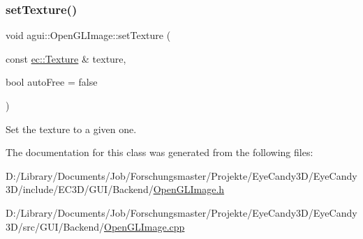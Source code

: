 \subsubsection{\texorpdfstring{set\+Texture()}{setTexture()}}
{\footnotesize\ttfamily void agui\+::\+Open\+G\+L\+Image\+::set\+Texture (\begin{DoxyParamCaption}\item[{const \mbox{\hyperlink{classec_1_1_texture}{ec\+::\+Texture}} \&}]{texture,  }\item[{bool}]{auto\+Free = {\ttfamily false} }\end{DoxyParamCaption})}

Set the texture to a given one. 

The documentation for this class was generated from the following files\+:\begin{DoxyCompactItemize}
\item 
D\+:/\+Library/\+Documents/\+Job/\+Forschungsmaster/\+Projekte/\+Eye\+Candy3\+D/\+Eye\+Candy3\+D/include/\+E\+C3\+D/\+G\+U\+I/\+Backend/\mbox{\hyperlink{_open_g_l_image_8h}{Open\+G\+L\+Image.\+h}}\item 
D\+:/\+Library/\+Documents/\+Job/\+Forschungsmaster/\+Projekte/\+Eye\+Candy3\+D/\+Eye\+Candy3\+D/src/\+G\+U\+I/\+Backend/\mbox{\hyperlink{_open_g_l_image_8cpp}{Open\+G\+L\+Image.\+cpp}}\end{DoxyCompactItemize}
